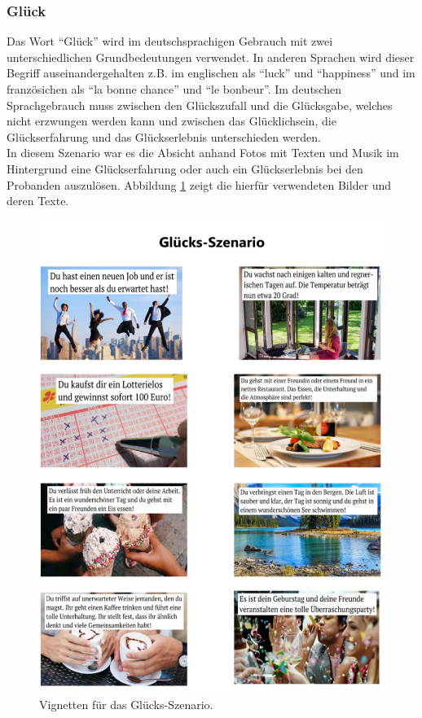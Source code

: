 \subsubsection{Glück} \label{glueck-1}






Das Wort ``Glück'' wird im deutschsprachigen Gebrauch mit zwei unterschiedlichen Grundbedeutungen verwendet. 
In anderen Sprachen wird dieser Begriff auseinandergehalten z.B. im englischen als ``luck'' und ``happiness'' und im französichen als ``la bonne chance'' und ``le bonbeur''.
Im deutschen Sprachgebrauch muss zwischen den Glückszufall und die Glücksgabe, welches nicht erzwungen werden kann und zwischen das Glücklichsein, die Glückserfahrung und das Glückserlebnis unterschieden werden\cite{bien19}. \\

In diesem Szenario war es die Absicht anhand Fotos mit Texten und Musik im Hintergrund eine Glückserfahrung oder auch ein Glückserlebnis bei den Probanden auszulösen.
Abbildung \ref{fig-glueck} zeigt die hierfür verwendeten Bilder und deren Texte. \\

\begin{figure}[H] \centering
\includegraphics[width=12cm]{Images/gluck.png} 
\vspace{-0.3cm} 
\caption{Vignetten für das Glücks-Szenario.}
\label{fig-glueck} 
\end{figure}

